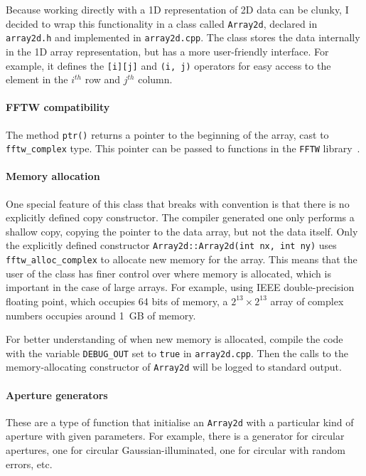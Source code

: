 \documentclass[11pt]{article}
\begin{document}
Because working directly with a 1D representation of 2D data can be clunky, I decided to wrap this functionality in a class called \texttt{Array2d}, declared in \texttt{array2d.h} and implemented in \texttt{array2d.cpp}. The class stores the data internally in the 1D array representation, but has a more user-friendly interface. For example, it defines the \texttt{[i][j]} and \texttt{(i, j)} operators for easy access to the element in the $i^{th}$ row and $j^{th}$ column.

\paragraph{FFTW compatibility} The method \texttt{ptr()} returns a pointer to the beginning of the array, cast to \texttt{fftw\_complex} type. This pointer can be passed to functions in the \texttt{FFTW} library~\cite[Section 4]{fftw}.

\paragraph{Memory allocation} One special feature of this class that breaks with convention is that there is no explicitly defined copy constructor. The compiler generated one only performs a shallow copy, copying the pointer to the data array, but not the data itself. Only the explicitly defined constructor \texttt{Array2d::Array2d(int nx, int ny)} uses \texttt{fftw\_alloc\_complex} to allocate new memory for the array. This means that the user of the class has finer control over where memory is allocated, which is important in the case of large arrays. For example, using IEEE double-precision floating point, which occupies 64 bits of memory, a $2^{13} \times 2^{13}$ array of complex numbers occupies around \SI{1}{GB} of memory.

For better understanding of when new memory is allocated, compile the code with the variable \texttt{DEBUG\_OUT} set to \texttt{true} in \texttt{array2d.cpp}. Then the calls to the memory-allocating constructor of \texttt{Array2d} will be logged to standard output.

\paragraph{Aperture generators} These are a type of function that initialise an \texttt{Array2d} with a particular kind of aperture with given parameters. For example, there is a generator for circular apertures, one for circular Gaussian-illuminated, one for circular with random errors, etc.
\end{document}
